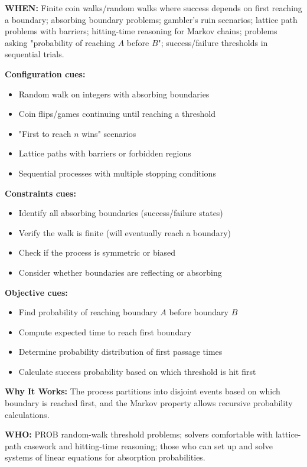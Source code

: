 \documentclass[12pt]{article}
\begin{document}
\textbf{WHEN:} Finite coin walks/random walks where success depends on first reaching a boundary; absorbing boundary problems; gambler's ruin scenarios; lattice path problems with barriers; hitting-time reasoning for Markov chains; problems asking "probability of reaching $A$ before $B$"; success/failure thresholds in sequential trials.

\textbf{Configuration cues:}
\begin{itemize}
    \item Random walk on integers with absorbing boundaries
    \item Coin flips/games continuing until reaching a threshold
    \item "First to reach $n$ wins" scenarios
    \item Lattice paths with barriers or forbidden regions
    \item Sequential processes with multiple stopping conditions
\end{itemize}

\textbf{Constraints cues:}
\begin{itemize}
    \item Identify all absorbing boundaries (success/failure states)
    \item Verify the walk is finite (will eventually reach a boundary)
    \item Check if the process is symmetric or biased
    \item Consider whether boundaries are reflecting or absorbing
\end{itemize}

\textbf{Objective cues:}
\begin{itemize}
    \item Find probability of reaching boundary $A$ before boundary $B$
    \item Compute expected time to reach first boundary
    \item Determine probability distribution of first passage times
    \item Calculate success probability based on which threshold is hit first
\end{itemize}

\textbf{Why It Works:} The process partitions into disjoint events based on which boundary is reached first, and the Markov property allows recursive probability calculations.

\textbf{WHO:} PROB random-walk threshold problems; solvers comfortable with lattice-path casework and hitting-time reasoning; those who can set up and solve systems of linear equations for absorption probabilities.
\end{document}
